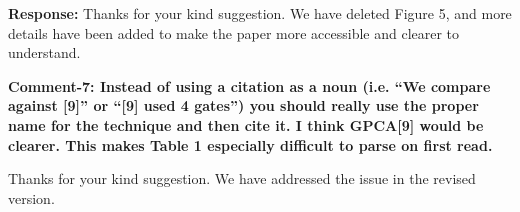 \documentclass[9pt,journal,compsoc]{IEEEtran}
\begin{document}
\begin{appendices}
{\bfseries Response:} Thanks for your kind suggestion. We have deleted Figure 5, and more details have been added to make the paper more accessible and clearer to understand.

{\bfseries Comment-7: Instead of using a citation as a noun (i.e. “We compare against [9]” or “[9] used 4 gates”) you should really use the proper name for the technique and then cite it. I think GPCA[9] would be clearer. This makes Table 1 especially difficult to parse on first read.}

 Thanks for your kind suggestion. We have addressed the issue in the revised version.
\end{appendices} 
\end{document}
